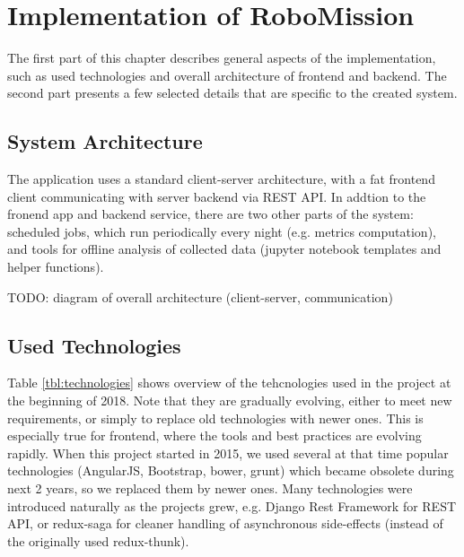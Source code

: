 \chapter{Implementation of RoboMission}
\label{chap:implementation-of-robomission}

The first part of this chapter describes general aspects of the implementation,
such as used technologies and overall architecture of frontend and backend.
The second part presents a few selected details that are specific to the created system.

\section{System Architecture}

The application uses a standard client-server architecture,
with a fat frontend client communicating with server backend via REST API.
In addtion to the fronend app and backend service,
there are two other parts of the system:
scheduled jobs, which run periodically every night (e.g. metrics computation),
and tools for offline analysis of collected data
(jupyter notebook templates and helper functions).  %


TODO: diagram of overall architecture (client-server, communication)

\section{Used Technologies}

Table \ref{tbl:technologies} shows overview of the tehcnologies used
in the project at the beginning of 2018.
Note that they are gradually evolving, either to meet new requirements,
or simply to replace old technologies with newer ones.
This is especially true for frontend, where the tools and best practices
are evolving rapidly.
When this project started in 2015,
we used several at that time popular technologies
(AngularJS, Bootstrap, bower, grunt)
which became obsolete during next 2 years,
so we replaced them by newer ones.
Many technologies were introduced naturally as the projects grew,
e.g. Django Rest Framework for REST API,
or redux-saga for cleaner handling of asynchronous side-effects
(instead of the originally used redux-thunk).



